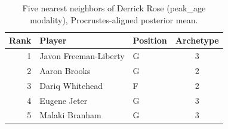 \begin{table}[htbp]
  \centering\small
  \begin{tabular}{rllc}
    \toprule
    Rank & Player & Position & Archetype \\
    \midrule
    1 & Javon Freeman-Liberty & G & 3 \\
    2 & Aaron Brooks & G & 2 \\
    3 & Dariq Whitehead & F & 2 \\
    4 & Eugene Jeter & G & 3 \\
    5 & Malaki Branham & G & 3 \\
    \bottomrule
  \end{tabular}
  \caption{Five nearest neighbors of Derrick Rose (peak_age modality), Procrustes-aligned posterior mean.}
  \label{tab:Derrick_Rose_neighbors_peak_age}
\end{table}

